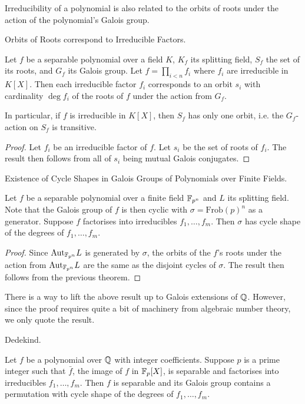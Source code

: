 \documentclass[../book.tex]{subfiles}
\begin{document}
Irreducibility of a polynomial is also related 
to the orbits of roots under the action of the polynomial's Galois group.
\begin{thm} Orbits of Roots correspond to Irreducible Factors.
    
    Let $f$ be a separable polynomial over a field $K$,
    $K_f$ its splitting field, $S_f$ the set of its roots, and $G_f$ its Galois group.
    Let $f = \prod_{i<n} f_i$ where $f_i$ are irreducible in $K[X]$.
    Then each irreducible factor $f_i$ corresponds 
    to an orbit $s_i$ with cardinality $\deg f_i$ of the roots of $f$
    under the action from $G_f$. 
    
    In particular, if $f$ is irreducible in $K[X]$, 
    then $S_f$ has only one orbit,
    i.e. the $G_f$-action on $S_f$ is transitive.
    
\end{thm}
\begin{proof}
    
    Let $f_i$ be an irreducible factor of $f$. 
    Let $s_i$ be the set of roots of $f_i$.
    The result then follows from all of $s_i$ being mutual Galois conjugates. 
\end{proof}

\begin{cor} Existence of Cycle Shapes in Galois Groups of Polynomials 
over Finite Fields.
    
    Let $f$ be a separable polynomial over a finite field $\mathbb{F}_{p^n}$ and 
    $L$ its splitting field. 
    Note that the Galois group of $f$ is then cyclic with 
    $\sigma = \mathrm{Frob}(p)^n$ as a generator.
    Suppose $f$ factorises into irreducibles $f_1, \dots, f_m$. 
    Then $\sigma$ has cycle shape of the degrees of $f_1,\dots,f_m$.
\end{cor}
\begin{proof}
    Since $\mathrm{Aut}_{\mathbb{F}_{p^n}}L$ is generated by $\sigma$, 
    the orbits of the $f$'s roots under the action from $\mathrm{Aut}_{\mathbb{F}_{p^n}}L$
    are the same as the disjoint cycles of $\sigma$. 
    The result then follows from the previous theorem. 
\end{proof}
\begin{rmk}
    
    There is a way to lift the above result up to Galois extensions of $\mathbb{Q}$.
    However, since the proof requires quite a bit of machinery from 
    algebraic number theory, we only quote the result. 
    
\end{rmk}
\begin{thm} Dedekind. 
    
    Let $f$ be a polynomial over $\mathbb{Q}$ with integer coefficients. 
    Suppose $p$ is a prime integer such that $\bar{f}$, the image of $f$ in $\mathbb{F}_p[X]$,
    is separable and factorises into irreducibles $f_1, \dots, f_m$.
    Then $f$ is separable and its Galois group contains 
    a permutation with cycle shape of the degrees of $f_1,\dots,f_m$.
    
\end{thm}
\end{document}
